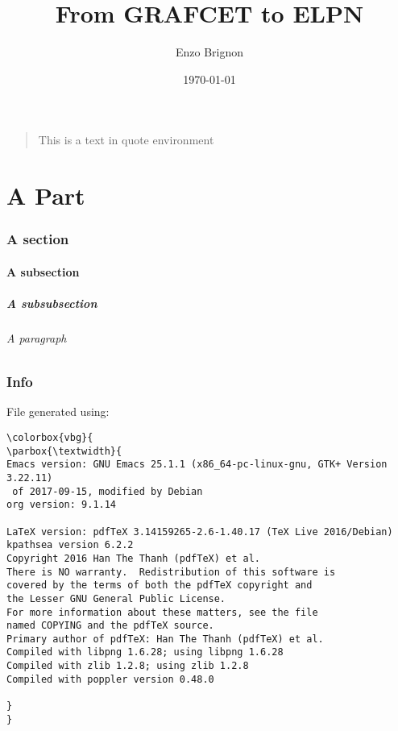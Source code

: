 \documentclass[a4paper, 12pt, english]{myreport}
\author{Enzo Brignon}
\date{\today}
\title{From GRAFCET to ELPN}
\begin{document}
\maketitle
\vspace{-2em}

\begin{quote}
This is a text in quote environment
\end{quote}

\tableofcontents
\newpage

\part{A Part}
\label{sec:orge27037d}
\section{A section}
\label{sec:orga27f17c}
\subsection{A subsection}
\label{sec:org776d751}
\subsubsection{A subsubsection}
\label{sec:org7cca9b5}
\paragraph{A paragraph}
\label{sec:orgd794a68}


\section*{Info}
\label{sec:org8b6d891}
File generated using:
\begin{Verbatim}[commandchars=\\\{\}]
\colorbox{vbg}{
\parbox{\textwidth}{
Emacs version: GNU Emacs 25.1.1 (x86_64-pc-linux-gnu, GTK+ Version 3.22.11)
 of 2017-09-15, modified by Debian
org version: 9.1.14

LaTeX version: pdfTeX 3.14159265-2.6-1.40.17 (TeX Live 2016/Debian)
kpathsea version 6.2.2
Copyright 2016 Han The Thanh (pdfTeX) et al.
There is NO warranty.  Redistribution of this software is
covered by the terms of both the pdfTeX copyright and
the Lesser GNU General Public License.
For more information about these matters, see the file
named COPYING and the pdfTeX source.
Primary author of pdfTeX: Han The Thanh (pdfTeX) et al.
Compiled with libpng 1.6.28; using libpng 1.6.28
Compiled with zlib 1.2.8; using zlib 1.2.8
Compiled with poppler version 0.48.0

}
}
\end{Verbatim}
\end{document}
